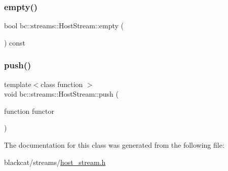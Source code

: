 \subsubsection{\texorpdfstring{empty()}{empty()}}
{\footnotesize\ttfamily bool bc\+::streams\+::\+Host\+Stream\+::empty (\begin{DoxyParamCaption}{ }\end{DoxyParamCaption}) const\hspace{0.3cm}{\ttfamily [inline]}}

\mbox{\label{classbc_1_1streams_1_1HostStream_a719b8268cb8171b6800a36eda3b8e511}} 
\subsubsection{\texorpdfstring{push()}{push()}}
{\footnotesize\ttfamily template$<$class function $>$ \\
void bc\+::streams\+::\+Host\+Stream\+::push (\begin{DoxyParamCaption}\item[{function}]{functor }\end{DoxyParamCaption})\hspace{0.3cm}{\ttfamily [inline]}}



The documentation for this class was generated from the following file\+:\begin{DoxyCompactItemize}
\item 
blackcat/streams/\hyperlink{host__stream_8h}{host\+\_\+stream.\+h}\end{DoxyCompactItemize}
